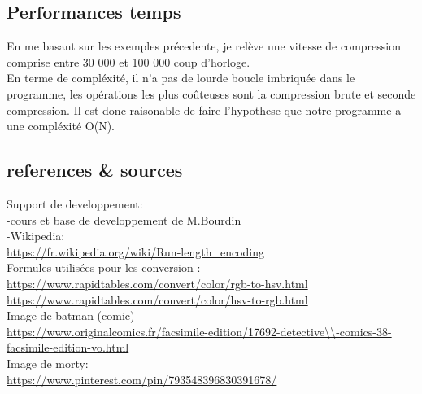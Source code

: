 \documentclass[12pt, letterpaper]{article}
\begin{document}
\subsection{Performances temps}
En me basant sur les exemples précedente, je relève une vitesse de 
compression comprise entre 30 000 et 100 000 coup d'horloge.\\
En terme de compléxité, il n'a pas de lourde boucle imbriquée dans le programme, les opérations 
les plus coûteuses sont la compression brute et seconde compression. Il est donc raisonable de faire 
l'hypothese que notre programme a une compléxité O(N).

\subsection{references \& sources}
Support de developpement:\\
-cours et base de developpement de M.Bourdin\\
-Wikipedia:\\
\url{https://fr.wikipedia.org/wiki/Run-length_encoding}\\
Formules utilisées pour les conversion :\\ 
\url{https://www.rapidtables.com/convert/color/rgb-to-hsv.html}\\
\url{https://www.rapidtables.com/convert/color/hsv-to-rgb.html}\\
Image de batman (comic)\\
\url{https://www.originalcomics.fr/facsimile-edition/17692-detective\\-comics-38-facsimile-edition-vo.html}\\
Image de morty: \\
\url{https://www.pinterest.com/pin/793548396830391678/}\\
\end{document}
